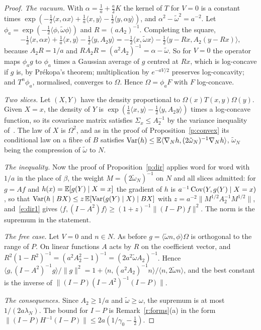 \begin{proof}
\emph{The vacuum.} With $\alpha=\tfrac1a+\tfrac a2K$ the kernel of $T$ for $V=0$ is a constant times
$\exp(-\tfrac12\langle x,\alpha x\rangle+\tfrac1a\langle x,y\rangle-\tfrac12\langle y,\alpha y\rangle)$, and
$\alpha^2-\tilde\omega^2=a^{-2}$. Let $\phi_a=\exp(-\tfrac12\langle\phi,\tilde\omega\phi\rangle)$ and
$R=(aA_2)^{-1}$. Completing the square,
\[
-\tfrac12\langle x,\alpha x\rangle+\tfrac1a\langle x,y\rangle-\tfrac12\langle y,A_2y\rangle
=-\tfrac12\langle x,\tilde\omega x\rangle-\tfrac12\langle y-Rx,A_2(y-Rx)\rangle ,
\]
because $A_2R=1/a$ and $RA_2R=(a^2A_2)^{-1}=\alpha-\tilde\omega$. So for $V=0$ the operator maps $\phi_ag$ to
$\phi_a$ times a Gaussian average of $g$ centred at $Rx$, which is log-concave if $g$ is, by Pr\'ekopa's
theorem; multiplication by $e^{-aV/2}$ preserves log-concavity; and $T^n\phi_a$, normalised, converges to
$\Omega$. Hence $\Omega=\phi_aF$ with $F$ log-concave.

\emph{Two slices.} Let $(X,Y)$ have the density proportional to $\Omega(x)T(x,y)\Omega(y)$. Given $X=x$,
the density of $Y$ is $\exp(\tfrac1a\langle x,y\rangle-\tfrac12\langle y,A_2y\rangle)$ times a log-concave
function, so its covariance matrix satisfies $\Sigma_x\le A_2^{-1}$ by the variance inequality
of~\cite{BL76}. The law of $X$ is $\Omega^2$, and as in the proof of Proposition~\ref{p:convex} its
conditional law on a fibre of $B$ satisfies
$\operatorname{Var}(h)\le\mathbb{E}\langle\nabla_Nh,(2\tilde\omega_N)^{-1}\nabla_Nh\rangle$, $\tilde\omega_N$ being
the compression of $\tilde\omega$ to $N$.

\emph{The inequality.} Now the proof of Proposition~\ref{p:dir} applies word for word with $1/a$ in the
place of $\beta$, the weight $M=(2\tilde\omega_N)^{-1}$ on $N$ and all slices admitted: for $g=Af$ and
$h(x)=\mathbb{E}[g(Y)\mid X=x]$ the gradient of $h$ is $a^{-1}\operatorname{Cov}(Y,g(Y)\mid X=x)$, so that
$\operatorname{Var}(h\mid BX)\le z\,\mathbb{E}[\operatorname{Var}(g(Y)\mid X)\mid BX]$ with
$z=a^{-2}\|M^{1/2}A_2^{-1}M^{1/2}\|$, and~\eqref{e:dir1} gives
$\langle f,(I-A^2)f\rangle\ge(1+z)^{-1}\|(I-P)f\|^2$. The norm is the supremum in the statement.

\emph{The free case.} Let $V=0$ and $n\in N$. As before $g=\langle\tilde\omega n,\phi\rangle\Omega$ is
orthogonal to the range of $P$. On linear functions $A$ acts by $R$ on the coefficient vector, and
$R^2(1-R^2)^{-1}=(a^2A_2^2-1)^{-1}=(2a^2\tilde\omega A_2)^{-1}$. Hence
$\langle g,(I-A^2)^{-1}g\rangle/\|g\|^2=1+\langle n,(a^2A_2)^{-1}n\rangle/\langle n,2\tilde\omega n\rangle$,
and the best constant is the inverse of $\|(I-P)(I-A^2)^{-1}(I-P)\|$.

\emph{The consequences.} Since $A_2\ge1/a$ and $\tilde\omega\ge\omega$, the supremum is at most
$1/(2a\lambda_N)$. The bound for $I-P$ is Remark~\ref{r:forms}(a) in the form
$\|(I-P)H^{-1}(I-P)\|\le2a(1/\gamma_0-\tfrac12)$.
\end{proof}

